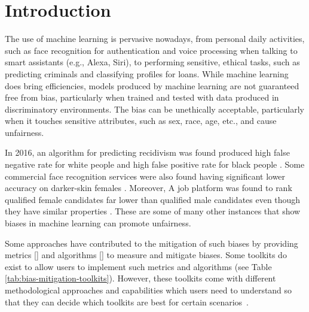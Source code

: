 \documentclass[sigconf,review]{acmart}
\begin{document}

\maketitle

\section{Introduction}
\label{sec:introduction}
The use of machine learning is pervasive nowadays, from personal daily activities, such as face recognition for authentication and voice processing when talking to smart assistants (e.g., Alexa, Siri), to performing sensitive, ethical tasks, such as predicting criminals and classifying profiles for loans. While machine learning does bring efficiencies, models produced by machine learning are not guaranteed free from bias, particularly when trained and tested with data produced in discriminatory environments. The bias can be unethically acceptable, particularly when it touches sensitive attributes, such as sex, race, age, etc., and cause unfairness. 

In 2016, an algorithm for predicting recidivism was found produced high false negative rate for white people and high false positive rate for black people \cite{angwin2016machine}. Some commercial face recognition services were also found having significant lower accuracy on darker-skin females \cite{buolamwini2018gender}. Moreover, A job platform was found to rank qualified female candidates far lower than qualified male candidates even though they have similar properties \cite{lahoti2019ifair}. These are some of many other instances that show biases in machine learning can promote unfairness. 

Some approaches have contributed to the mitigation of such biases by providing metrics []  and algorithms [] to measure and mitigate biases. Some toolkits do exist to allow users to implement such metrics and algorithms (see Table \ref{tab:bias-mitigation-toolkits}).
However, these toolkits come with different methodological approaches and capabilities which users need to understand so that they can decide which toolkits are best for certain scenarios~\cite{lee2021landscape}.  
\end{document}

